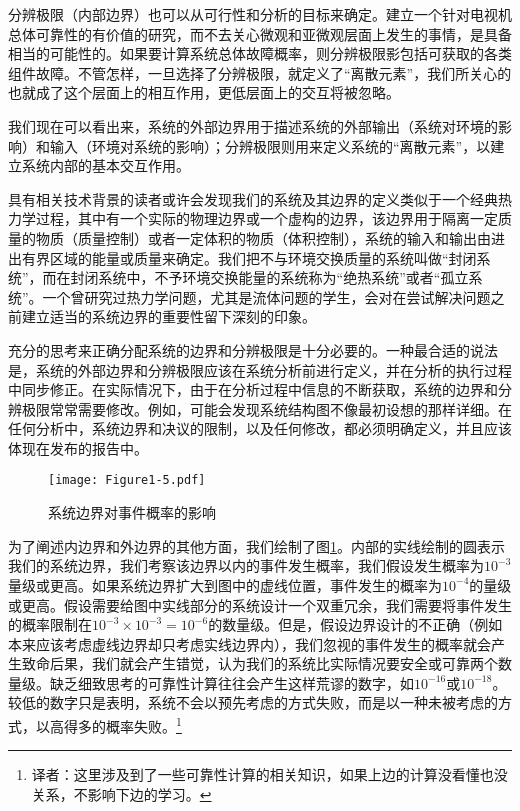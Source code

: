 \documentclass[cn,11pt,chinese]{elegantbook}
\begin{document}
分辨极限（内部边界）也可以从可行性和分析的目标来确定。建立一个针对电视机总体可靠性的有价值的研究，而不去关心微观和亚微观层面上发生的事情，是具备相当的可能性的。如果要计算系统总体故障概率，则分辨极限影包括可获取的各类组件故障。不管怎样，一旦选择了分辨极限，就定义了“离散元素”，我们所关心的也就成了这个层面上的相互作用，更低层面上的交互将被忽略。

我们现在可以看出来，系统的外部边界用于描述系统的外部输出（系统对环境的影响）和输入（环境对系统的影响）；分辨极限则用来定义系统的“离散元素”，以建立系统内部的基本交互作用。

具有相关技术背景的读者或许会发现我们的系统及其边界的定义类似于一个经典热力学过程，其中有一个实际的物理边界或一个虚构的边界，该边界用于隔离一定质量的物质（质量控制）或者一定体积的物质（体积控制），系统的输入和输出由进出有界区域的能量或质量来确定。我们把不与环境交换质量的系统叫做“封闭系统”，而在封闭系统中，不予环境交换能量的系统称为“绝热系统”或者“孤立系统”。一个曾研究过热力学问题，尤其是流体问题的学生，会对在尝试解决问题之前建立适当的系统边界的重要性留下深刻的印象。

充分的思考来正确分配系统的边界和分辨极限是十分必要的。一种最合适的说法是，系统的外部边界和分辨极限应该在系统分析前进行定义，并在分析的执行过程中同步修正。在实际情况下，由于在分析过程中信息的不断获取，系统的边界和分辨极限常常需要修改。例如，可能会发现系统结构图不像最初设想的那样详细。在任何分析中，系统边界和决议的限制，以及任何修改，都必须明确定义，并且应该体现在发布的报告中。

\begin{figure}[htpb]
	\centering
	\texttt{[image: Figure1-5.pdf]}
	\caption{系统边界对事件概率的影响}\label{fig:fig1_5}
\end{figure}

为了阐述内边界和外边界的其他方面，我们绘制了图\ref{fig:fig1_5}。内部的实线绘制的圆表示我们的系统边界，我们考察该边界以内的事件发生概率，我们假设发生概率为$10^{-3}$量级或更高。如果系统边界扩大到图中的虚线位置，事件发生的概率为$10^{-4}$的量级或更高。假设需要给图中实线部分的系统设计一个双重冗余，我们需要将事件发生的概率限制在$10^{-3}\times 10^{-3}=10^{-6}$的数量级。但是，假设边界设计的不正确（例如本来应该考虑虚线边界却只考虑实线边界内），我们忽视的事件发生的概率就会产生致命后果，我们就会产生错觉，认为我们的系统比实际情况要安全或可靠两个数量级。缺乏细致思考的可靠性计算往往会产生这样荒谬的数字，如$10^{-16}$或$10^{-18}$。较低的数字只是表明，系统不会以预先考虑的方式失败，而是以一种未被考虑的方式，以高得多的概率失败。\footnote{译者：这里涉及到了一些可靠性计算的相关知识，如果上边的计算没看懂也没关系，不影响下边的学习。}
\end{document}
